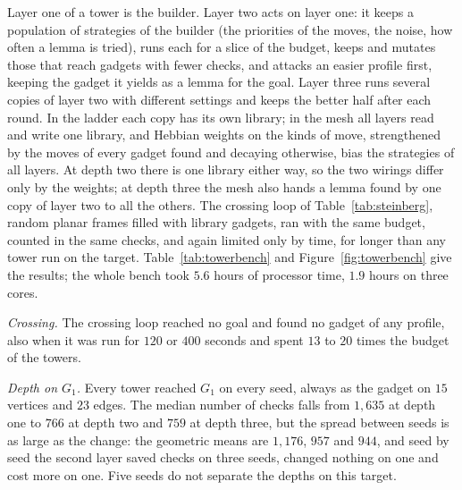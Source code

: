 Layer one of a tower is the builder. Layer two acts on layer one: it keeps a population of strategies of the builder (the priorities of the moves, the noise, how often a lemma is tried), runs each for a slice of the budget, keeps and mutates those that reach gadgets with fewer checks, and attacks an easier profile first, keeping the gadget it yields as a lemma for the goal. Layer three runs several copies of layer two with different settings and keeps the better half after each round. In the ladder each copy has its own library; in the mesh all layers read and write one library, and Hebbian weights on the kinds of move, strengthened by the moves of every gadget found and decaying otherwise, bias the strategies of all layers. At depth two there is one library either way, so the two wirings differ only by the weights; at depth three the mesh also hands a lemma found by one copy of layer two to all the others. The crossing loop of Table~\ref{tab:steinberg}, random planar frames filled with library gadgets, ran with the same budget, counted in the same checks, and again limited only by time, for longer than any tower run on the target. Table~\ref{tab:towerbench} and Figure~\ref{fig:towerbench} give the results; the whole bench took $5.6$ hours of processor time, $1.9$ hours on three cores.

\emph{Crossing.} The crossing loop reached no goal and found no gadget of any profile, also when it was run for $120$ or $400$ seconds and spent $13$ to $20$ times the budget of the towers.

\emph{Depth on $G_{1}$.} Every tower reached $G_{1}$ on every seed, always as the gadget on $15$ vertices and $23$ edges. The median number of checks falls from $1{,}635$ at depth one to $766$ at depth two and $759$ at depth three, but the spread between seeds is as large as the change: the geometric means are $1{,}176$, $957$ and $944$, and seed by seed the second layer saved checks on three seeds, changed nothing on one and cost more on one. Five seeds do not separate the depths on this target.

